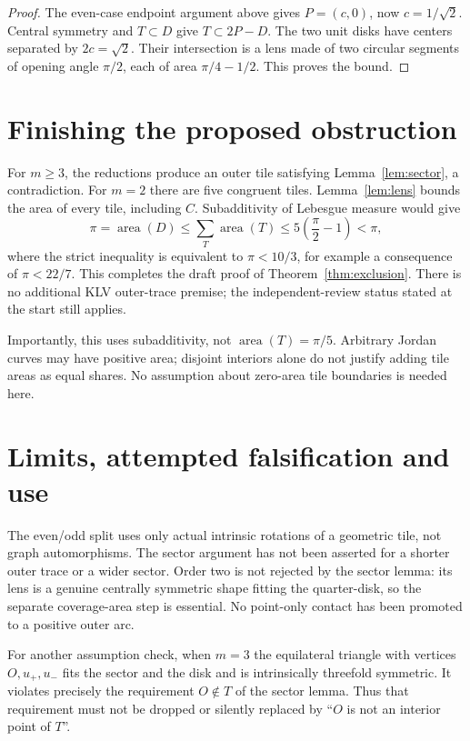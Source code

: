 \documentclass[11pt]{article}
\newcommand{\area}{\operatorname{area}}
\begin{document}
\begin{proof}
The even-case endpoint argument above gives $P=(c,0)$, now $c=1/\sqrt2$.
Central symmetry and $T\subset D$ give $T\subset2P-D$. The two unit disks
have centers separated by $2c=\sqrt2$. Their intersection is a lens made of
two circular segments of opening angle $\pi/2$, each of area $\pi/4-1/2$.
This proves the bound.
\end{proof}

\section{Finishing the proposed obstruction}

For $m\geq3$, the reductions produce an outer tile satisfying
Lemma~\ref{lem:sector}, a contradiction. For $m=2$ there are five congruent
tiles. Lemma~\ref{lem:lens} bounds the area of every tile, including $C$.
Subadditivity of Lebesgue measure would give
\[
 \pi=\area(D)\leq\sum_T\area(T)
 \leq5\left(\frac\pi2-1\right)<\pi,
\]
where the strict inequality is equivalent to $\pi<10/3$, for example a
consequence of $\pi<22/7$. This completes the draft proof of
Theorem~\ref{thm:exclusion}. There is no additional KLV outer-trace premise;
the independent-review status stated at the start still applies.

Importantly, this uses subadditivity, not $\area(T)=\pi/5$. Arbitrary Jordan
curves may have positive area; disjoint interiors alone do not justify adding
tile areas as equal shares. No assumption about zero-area tile boundaries is
needed here.

\section{Limits, attempted falsification and use}

The even/odd split uses only actual intrinsic rotations of a geometric tile,
not graph automorphisms. The sector argument has not been asserted for a
shorter outer trace or a wider sector. Order two is not rejected by the
sector lemma: its lens is a genuine centrally symmetric shape fitting the
quarter-disk, so the separate coverage-area step is essential. No point-only
contact has been promoted to a positive outer arc.

For another assumption check, when $m=3$ the equilateral triangle with vertices
$O,u_+,u_-$ fits the sector and the disk and is intrinsically threefold
symmetric. It violates precisely the requirement $O\notin T$ of the sector
lemma. Thus that requirement must not be dropped or silently replaced by
``$O$ is not an interior point of $T$''.
\end{document}

